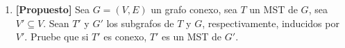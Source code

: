 \begin{enumerate}[label ={\bf P\arabic*}]
	\item \textbf{[Propuesto]} Sea $G=(V,E)$ un grafo conexo, sea $T$ un MST de $G$, sea $V'\subseteq V$.
	Sean $T'$ y $G'$ los subgrafos de $T$ y $G$, respectivamente, inducidos por $V'$.
	Pruebe que si $T'$ es conexo, $T'$ es un MST de $G'$.
\end{enumerate}
